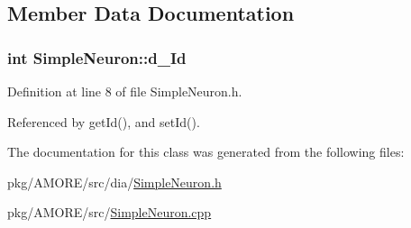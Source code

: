 \subsection{Member Data Documentation}
\hypertarget{class_simple_neuron_ad87b0b67c7f8bfe5377313c1e3fac60c}{
\subsubsection[{d\_\-Id}]{\setlength{\rightskip}{0pt plus 5cm}int {\bf SimpleNeuron::d\_\-Id}}}
\label{class_simple_neuron_ad87b0b67c7f8bfe5377313c1e3fac60c}


Definition at line 8 of file SimpleNeuron.h.



Referenced by getId(), and setId().



The documentation for this class was generated from the following files:\begin{DoxyCompactItemize}
\item 
pkg/AMORE/src/dia/\hyperlink{_simple_neuron_8h}{SimpleNeuron.h}\item 
pkg/AMORE/src/\hyperlink{_simple_neuron_8cpp}{SimpleNeuron.cpp}\end{DoxyCompactItemize}
